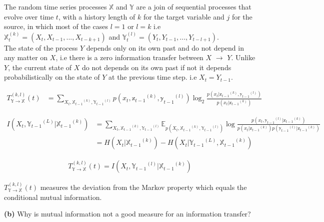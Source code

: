 \documentclass[11pt]{article}
\begin{document}
The random time series processes $\mathbb{X}$ and $\mathbb{Y}$ are a join of sequential processes that evolve over time $t$, with a history length of $k$ for the target variable and $j$ for the source, in which most of the cases $l=1$ or $l=k$ i.e $\mathbb {X}^{(k)}_{t} = (X_{t}, X_{t-1},...,X_{t-k+1})$ and $\mathbb {Y}^{(l)}_{t} = (Y_{t}, Y_{t-1},...,Y_{t-l+1})$.\\

The state of the process $Y$ depends only on its own past and do not depend in any matter on $X$, i.e there is a zero information transfer between $X$ $\rightarrow$ $Y$. Unlike $Y$, the current state of $X$ do not depends on its own past if not it depends probabilistically on the state of $Y$ at the previous time step. i.e $X_{t} = Y_{t-1}$.

\begin{equation*}
\begin{split}
{T}^{(k,l)}_{\mathbb{Y}\rightarrow \mathbb{X}}(t) &= \sum_{X_{t}, {\mathbb{X}_{t-1}}^{(k)},{\mathbb{Y}_{t-1}}^{(l)}} p(x_{t}, {\mathbb{x}_{t-1}}^{(k)},{\mathbb{y}_{t-1}}^{(l)}) \log_{2} \frac{p(x_{t}|{\mathbb{x}_{t-1}}^{(k)},{\mathbb{y}_{t-1}}^{(l)})}{p(x_{t}|{\mathbb{x}_{t-1}}^{(k)})}
\end{split}
\end{equation*}



\begin{equation*}
\begin{split}
 I(X_{t}, {\mathbb{Y}_{t-1}}^{(L)}|{\mathbb{X}_{t-1}}^{(k)}) &= \sum_{X_{t}, {\mathbb{X}_{t-1}}^{(k)},{\mathbb{Y}_{t-1}}^{(l)}} \mathbb{E}_{p({X_{t}, {\mathbb{X}_{t-1}}^{(k)},{\mathbb{Y}_{t-1}}^{(l)}})} \log\frac{p(x_{t}, {\mathbb{y}_{t-1}}^{(l)}|{\mathbb{x}_{t-1}}^{(k)})}{p(x_{t}|{\mathbb{x}_{t-1}}^{(k)}) p({\mathbb{y}_{t-1}}^{(l)}|{\mathbb{x}_{t-1}}^{(k)})}\\
 & = H(X_{t}|{\mathbb{X}_{t-1}}^{(k)}) - H(X_{t}| {\mathbb{Y}_{t-1}}^{(L)}, {\mathbb{X}_{t-1}}^{(k)})
\end{split}
\end{equation*}

\begin{equation*}
\begin{split}
{T}^{(k,l)}_{\mathbb{Y}\rightarrow \mathbb{X}}(t)  = I(X_{t}, {\mathbb{Y}_{t-1}}^{(l)}|{\mathbb{X}_{t-1}}^{(k)}) 
\end{split}
\end{equation*}

${T}^{(k,l)}_{\mathbb{Y}\rightarrow \mathbb{X}}(t)$ measures the deviation from the Markov property which equals the conditional mutual information.
\begin{tcolorbox}
\textbf{(b)}
Why is mutual information not a good measure for an information transfer?
\end{tcolorbox}
\end{document}
